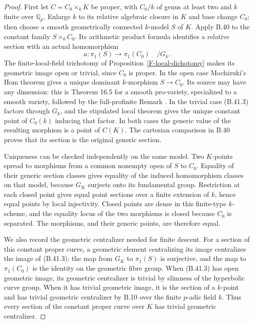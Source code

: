 \begin{proof}
First let $C=C_0\times_k K$ be proper, with
$C_0/k$ of genus at least two and $k$ finite over
$\mathbb Q_p$. Enlarge $k$ to its relative
algebraic closure in $K$ and base change $C_0$;
then choose a smooth geometrically connected
$k$-model $S$ of $K$. Apply B.40 to the constant
family $S\times_k C_0$. Its arithmetic product
formula identifies a relative section with an
actual homomorphism
\[
 a:\pi_1(S)\longrightarrow\pi_1(C_0)
                                          \quad/G_k.
 \tag{B.41.3}
\]
The finite-local-field trichotomy of
Proposition~\ref{F-local-dichotomy} makes its
geometric image open or trivial, since $C_0$ is
proper. In the open case Mochizuki's Hom theorem
gives a unique dominant $k$-morphism
$S\to C_0$. Its source may have any dimension:
this is Theorem 16.5 for a smooth pro-variety,
specialized to a smooth variety, followed by the
full-profinite Remark \cite{F-Mochizuki}.
In the trivial case (B.41.3) factors through
$G_k$, and the stipulated local theorem gives
the unique constant point of $C_0(k)$ inducing
that factor. In both cases the generic value of
the resulting morphism is a point of $C(K)$.
The cartesian comparison in B.40 proves that
its section is the original generic section.

Uniqueness can be checked independently on the
same model. Two $K$-points spread to morphisms
from a common nonempty open of $S$ to $C_0$.
Equality of their generic section classes gives
equality of the induced homomorphism classes on
that model, because $G_K$ surjects onto its
fundamental group. Restriction at each closed
point gives equal point sections over a finite
extension of $k$, hence equal points by local
injectivity. Closed points are dense in this
finite-type $k$-scheme, and the equality locus
of the two morphisms is closed because $C_0$ is
separated. The morphisms, and their generic
points, are therefore equal.

We also record the geometric centralizer needed
for finite descent. For a section of this constant
proper curve, a geometric element centralizing
its image centralizes the image of (B.41.3):
the map from $G_K$ to $\pi_1(S)$ is surjective,
and the map to $\pi_1(C_0)$ is the identity on
the geometric fibre group. When (B.41.3) has
open geometric image, its geometric centralizer
is trivial by slimness of the hyperbolic curve
group. When it has trivial geometric image,
it is the section of a $k$-point and has trivial
geometric centralizer by B.10 over the finite
$p$-adic field $k$. Thus every section of the
constant proper curve over $K$ has trivial
geometric centralizer.


\end{proof}
